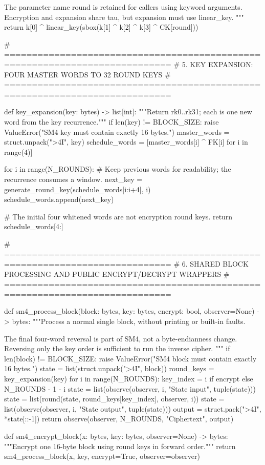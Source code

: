 \begin{lightcode}[numbers=left,firstnumber=1]
    The parameter name round is retained for callers using keyword arguments.
    Encryption and expansion share tau, but expansion must use linear_key.
    """
    return k[0] ^ linear_key(sbox(k[1] ^ k[2] ^ k[3] ^ CK[round]))


# ============================================================================
# 5. KEY EXPANSION: FOUR MASTER WORDS TO 32 ROUND KEYS
# ============================================================================


def key_expansion(key: bytes) -> list[int]:
    """Return rk0..rk31; each is one new word from the key recurrence."""
    if len(key) != BLOCK_SIZE:
        raise ValueError("SM4 key must contain exactly 16 bytes.")
    master_words = struct.unpack(">4I", key)
    schedule_words = [master_words[i] ^ FK[i] for i in range(4)]

    for i in range(N_ROUNDS):
        # Keep previous words for readability; the recurrence consumes a window.
        next_key = generate_round_key(schedule_words[i:i+4], i)
        schedule_words.append(next_key)

    # The initial four whitened words are not encryption round keys.
    return schedule_words[4:]


# ============================================================================
# 6. SHARED BLOCK PROCESSING AND PUBLIC ENCRYPT/DECRYPT WRAPPERS
# ============================================================================


def sm4_process_block(block: bytes, key: bytes, encrypt: bool, observer=None) -> bytes:
    """Process a normal single block, without printing or built-in faults.

    The final four-word reversal is part of SM4, not a byte-endianness change.
    Reversing only the key order is sufficient to run the inverse cipher.
    """
    if len(block) != BLOCK_SIZE:
        raise ValueError("SM4 block must contain exactly 16 bytes.")
    state = list(struct.unpack(">4I", block))
    round_keys = key_expansion(key)
    for i in range(N_ROUNDS):
        key_index = i if encrypt else N_ROUNDS - 1 - i
        state = list(observe(observer, i, "State input", tuple(state)))
        state = list(round(state, round_keys[key_index], observer, i))
        state = list(observe(observer, i, "State output", tuple(state)))
    output = struct.pack(">4I", *state[::-1])
    return observe(observer, N_ROUNDS, "Ciphertext", output)


def sm4_encrypt_block(x: bytes, key: bytes, observer=None) -> bytes:
    """Encrypt one 16-byte block using round keys in forward order."""
    return sm4_process_block(x, key, encrypt=True, observer=observer)



\end{lightcode}
